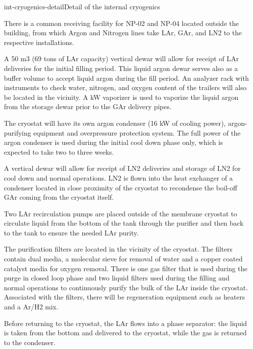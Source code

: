 \begin{cdrfigure}{int-cryogenics-detail}{Detail of the internal cryogenics} 
\end{cdrfigure}


There is a common receiving facility for NP-02 and NP-04 located outside the building, from which Argon and Nitrogen lines take LAr, GAr, and LN2 to the respective installations.

A 50 m3 (69 tons of LAr capacity) vertical dewar will allow for receipt of LAr deliveries for the initial filling period. This liquid argon dewar serves also as a buffer volume to accept liquid argon during the fill period. An analyzer rack with instruments to check water, nitrogen, and oxygen content of the trailers will also be located in the vicinity. A  kW vaporizer is used to vaporize the liquid argon from the storage dewar prior to the GAr delivery pipes.

The cryostat will have its own argon condenser (16 kW of cooling power), argon-purifying equipment and overpressure protection system. The full power of the argon condenser is used during the initial cool down phase only, which is expected to take two to three weeks. 

A  vertical dewar will allow for receipt of LN2 deliveries and storage of LN2 for cool down and normal operations. LN2 is flown into the heat exchanger of a condenser located in close proximity of the cryostat to recondense the boil-off GAr coming from the cryostat itself.

Two LAr recirculation pumps are placed outside of the membrane cryostat to circulate liquid from the bottom of the tank through the purifier and then back to the tank to ensure the needed LAr purity.

The purification filters are located in the vicinity of the cryostat. The filters contain dual media, a molecular sieve for removal of water and a copper coated catalyst media for oxygen removal. There is one gas filter that is used during the purge in closed loop phase and two liquid filters used during the filling and normal operations to continuously purify the bulk of the LAr inside the cryostat. Associated with the filters, there will be regeneration equipment such as heaters and a Ar/H2 mix.

Before returning to the cryostat, the LAr flows into a phase separator: the liquid is taken from the bottom and delivered to the cryostat, while the gas is returned to the condenser.


